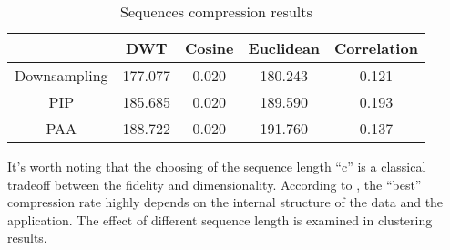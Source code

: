 \begin{table}[!htbp]
    \centering
    \hspace{0.5cm}
    \begin{tabular}{|c|c|c|c|c|}
        \hline
         & DWT & Cosine & Euclidean & Correlation \\ \hline
        Downsampling & 177.077 & 0.020 & 180.243 & 0.121 \\ \hline
        PIP & 185.685 & 0.020 & 189.590 & 0.193 \\ \hline
        PAA & 188.722 & 0.020 & 191.760 & 0.137 \\ \hline
    \end{tabular}
    \caption{Sequences compression results}
    \label{tab:compression1}
\end{table}
It's worth noting that the choosing of the sequence length ``c'' is a classical tradeoff between the fidelity and dimensionality. According to \cite{keogh2000scaling}, the ``best'' compression rate highly depends on the internal structure of the data and the application. The effect of different sequence length is examined in clustering results.